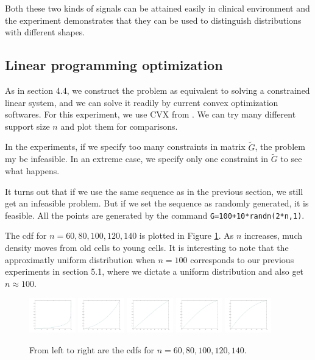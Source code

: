 \documentclass{article}
\begin{document}
Both these two kinds of signals can be attained easily in clinical environment and the experiment demonstrates that they can be used to distinguish distributions with different shapes.

\subsection{Linear programming optimization}
As in section 4.4, we construct the problem as equivalent to solving a constrained linear system, and we can solve it readily by current convex optimization softwares. For this experiment, we use  CVX from \citet{grant2008cvx}. We can try many different support size $n$ and plot them for comparisons.

In the experiments, if we specify too many constraints in matrix $\tilde{G}$, the problem my be infeasible. In an extreme case, we specify only one constraint in $\tilde{G}$ to see what happens.

It turns out that if we use the same sequence as in the previous section, we still get an infeasible problem. But if we set the sequence as randomly generated, it is feasible.
All the points are generated by the command \texttt{G=100+10*randn(2*n,1)}.


The cdf for $n=60,80,100,120,140$ is plotted in Figure \ref{fig3}. As $n$ increases, much density moves from old cells to young cells.  It is interesting to note that the approximatly uniform distribution when $n=100$ corresponds to our previous experiments in section 5.1, where we dictate a uniform distribution and also get $n\approx 100$.
\begin{figure}[h]
  \centering
  \includegraphics[width=2cm]{fig/60.jpg}
  \includegraphics[width=2cm]{fig/80.jpg}
  \includegraphics[width=2cm]{fig/100.jpg}
  \includegraphics[width=2cm]{fig/120.jpg}
  \includegraphics[width=2cm]{fig/140.jpg}
  \caption{From left to right are the cdfs for $n=60,80,100,120,140$.}
  \label{fig3}
\end{figure}
\end{document}
